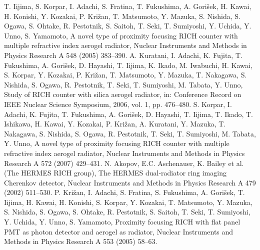 \documentclass[5p,twocolumn]{elsarticle}
\begin{document}
\begin{thebibliography}{00}
T. Iijima, S. Korpar, I. Adachi, S. Fratina, T. Fukushima, A. Gori\v{s}ek, H. Kawai, H. Konishi, Y. Kozakai, P. Kri\v{z}an, T. Matsumoto, Y. Mazuka, S. Nishida, S. Ogawa, S. Ohtake, R. Pestotnik, S. Saitoh, T. Seki, T. Sumiyoshi, Y. Uchida, Y. Unno, S. Yamamoto, A novel type of proximity focusing RICH counter with multiple refractive index aerogel radiator, Nuclear Instruments and Methods in Physics Research A 548 (2005) 383--390.
A. Kuratani, I. Adachi, K. Fujita, T. Fukushima, A. Gori\v{s}ek, D. Hayashi, T. Iijima, K. Ikado, M. Iwabuchi, H. Kawai, S. Korpar, Y. Kozakai, P. Kri\v{z}an, T. Matsumoto, Y. Mazuka, T. Nakagawa, S. Nishida, S. Ogawa, R. Pestotnik, T. Seki, T. Sumiyoshi, M. Tabata, Y. Unno, Study of RICH counter with silica aerogel radiator, in: Conference Record on IEEE Nuclear Science Symposium, 2006, vol. 1, pp. 476--480.
S. Korpar, I. Adachi, K. Fujita, T. Fukushima, A. Gori\v{s}ek, D. Hayashi, T. Iijima, T. Ikado, T. Ishikawa, H. Kawai, Y. Kozakai, P. Kri\v{z}an, A. Kuratani, Y. Mazuka, T. Nakagawa, S. Nishida, S. Ogawa, R. Pestotnik, T. Seki, T. Sumiyoshi, M. Tabata, Y. Unno, A novel type of proximity focusing RICH counter with multiple refractive index aerogel radiator, Nuclear Instruments and Methods in Physics Research A 572 (2007) 429--431.
N. Akopov, E.C. Aschenauer, K. Bailey et al. (The HERMES RICH group), The HERMES dual-radiator ring imaging Cherenkov detector, Nuclear Instruments and Methods in Physics Research A 479 (2002) 511--530.
P. Kri\v{z}an, I. Adachi, S. Fratina, S. Fukushima, A. Gori\v{s}ek, T. Iijima, H. Kawai, H. Konishi, S. Korpar, Y. Kozakai, T. Matsumoto, Y. Mazuka, S. Nishida, S. Ogawa, S. Ohtake, R. Pestotnik, S. Saitoh, T. Seki, T. Sumiyoshi, Y. Uchida, Y. Unno, S. Yamamoto, Proximity focusing RICH with flat panel PMT as photon detector and aerogel as radiator, Nuclear Instruments and Methods in Physics Research A 553 (2005) 58--63.
\end{thebibliography}
\end{document}
